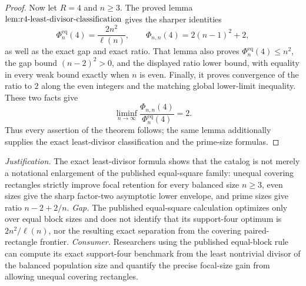 \documentclass{article}
\begin{document}
\begin{proof}
Now let \(R=4\) and \(n\ge3\). The proved lemma \(\textnormal{lem:r4-least-divisor-classification}\) gives the sharper identities
\[
\Phi_n^{\mathrm{eq}}(4)=\frac{2n^2}{\ell(n)},
\qquad
\Phi_{n,n}(4)=2(n-1)^2+2,
\]
as well as the exact gap and exact ratio. That lemma also proves \(\Phi_n^{\mathrm{eq}}(4)\le n^2\), the gap bound \((n-2)^2>0\), and the displayed ratio lower bound, with equality in every weak bound exactly when \(n\) is even. Finally, it proves convergence of the ratio to \(2\) along the even integers and the matching global lower-limit inequality. These two facts give
\[
\liminf_{n\to\infty}
\frac{\Phi_{n,n}(4)}{\Phi_n^{\mathrm{eq}}(4)}=2.
\]
Thus every assertion of the theorem follows; the same lemma additionally supplies the exact least-divisor classification and the prime-size formulas.
\end{proof}
\par\smallskip\noindent \textit{Justification.} The exact least-divisor formula shows that the catalog is not merely a notational enlargement of the published equal-square family: unequal covering rectangles strictly improve focal retention for every balanced size \(n\ge3\), even sizes give the sharp factor-two asymptotic lower envelope, and prime sizes give ratio \(n-2+2/n\). \textit{Gap.} The published equal-square calculation optimizes only over equal block sizes and does not identify that its support-four optimum is \(2n^2/\ell(n)\), nor the resulting exact separation from the covering paired-rectangle frontier. \textit{Consumer.} Researchers using the published equal-block rule can compute its exact support-four benchmark from the least nontrivial divisor of the balanced population size and quantify the precise focal-size gain from allowing unequal covering rectangles.
\end{document}
